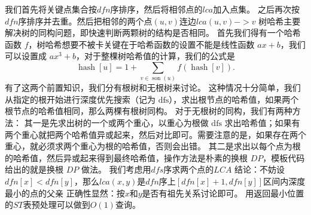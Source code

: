 {}我们首先将关键点集合按$ dfn $序排序，然后将相邻点的$ lca $加入点集。\markdownRendererParagraphSeparator
{}之后再次按$ dfn $序排序并去重。然后把相邻的两个点$ (u,v) $连边$ lca(u,v)->v $\markdownRendererInterblockSeparator
{}\markdownRendererInterblockSeparator
{}
\markdownRendererSectionEnd \markdownRendererSectionBegin
{}\markdownRendererInterblockSeparator
{}树哈希主要解决树的同构问题，即快速判断两颗树的结构是否相同。\markdownRendererParagraphSeparator
{}首先我们得有一个哈希函数 $f$，树哈希想要不被卡关键在于哈希函数的设置不能是线性函数 $ax+b$，我们可以设置成 $ax^3+b$，对于整棵树哈希值的计算，我们的公式是\markdownRendererSoftLineBreak
{}$$\operatorname{hash}[u]=1+\sum_{v\in \operatorname{son}(u)} f(\operatorname{hash}[v]).$$\markdownRendererParagraphSeparator
{}有了这两个前置知识，我们分有根树和无根树来讨论。\markdownRendererParagraphSeparator
{} 这种情况十分简单，我们从指定的根开始进行深度优先搜索（记为 $\mathrm{dfs}$），求出根节点的哈希值，如果两个根节点的哈希值相同，那么两棵有根树同构。\markdownRendererParagraphSeparator
{} 对于无根树的同构，我们有两种方法：\markdownRendererParagraphSeparator
{}其一是先求出树的一个或两个重心，以重心为根做 $\mathrm{dfs}$ 求出哈希值；如果有两个重心就把两个哈希值异或起来，然后对比即可。需要注意的是，如果存在两个重心，就必须求两个重心为根的哈希值，否则会出错。\markdownRendererHardLineBreak
{}其二是求出以每个点为根的哈希值，然后异或起来得到最终哈希值，操作方法是朴素的换根 $DP$，模板代码给出的就是换根 $DP$ 做法。\markdownRendererInterblockSeparator
{}\markdownRendererInterblockSeparator
{}
\markdownRendererSectionEnd \markdownRendererSectionBegin
{}\markdownRendererInterblockSeparator
{}我们考虑用$ dfs $序求两个点的$ LCA $\markdownRendererParagraphSeparator
{}结论：不妨设$ dfn[x]<dfn[y] $，那么$ lca(x,y) $是$ dfn $序上$ [dfn[x]+1,dfn[y]] $区间内深度最小的点的父亲\markdownRendererParagraphSeparator
{}正确性显然：按$ x和y $是否有祖先关系讨论即可。\markdownRendererParagraphSeparator
{}用返回最小位置的$ ST $表预处理可以做到$ O(1) $查询。\markdownRendererInterblockSeparator
{}\markdownRendererInterblockSeparator
{}
\markdownRendererSectionEnd \markdownRendererSectionBegin
{}\markdownRendererInterblockSeparator
